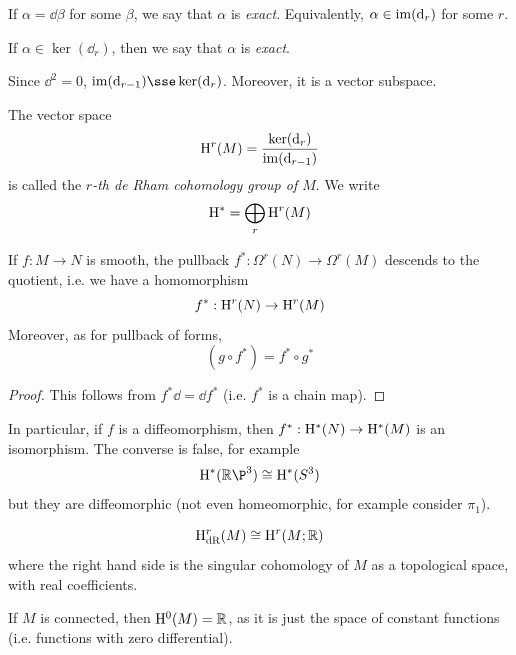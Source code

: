 \documentclass{article}
\begin{document}
\begin{definition}
     If \(\alpha = \dd\beta\) for some \(\beta\), we say that \(\alpha\) is \emph{exact}. Equivalently, \(\alpha \in \operatorname{im}(\dd_r)\) for some \(r\).
\end{definition}

\begin{definition}
     If \(\alpha \in \ker(\dd_r)\), then we say that \(\alpha\) is \emph{exact}.
\end{definition}

Since \(\dd^2 = 0\), \(\im(\dd_{r-1}) \sse \ker(\dd_r)\). Moreover, it is a vector subspace.

\begin{definition}
    The vector space
    \[\mathrm{H}^r(M) = \frac{\ker(\dd_r)}{\operatorname{im}(\dd_{r-1})}\]
    is called the \emph{\(r\)-th de Rham cohomology group of \(M\)}. We write
    \[\mathrm{H}^* = \bigoplus_r \mathrm{H}^r(M)\]
\end{definition}

\begin{proposition}
    If \(f : M \to N\) is smooth, the pullback \(f^* : \Omega^r(N) \to \Omega^r(M)\) descends to the quotient, i.e. we have a homomorphism
    \[f^* : \mathrm{H}^r(N) \to \mathrm{H}^r(M)\]
    Moreover, as for pullback of forms,
    \[(g \circ f^*) = f^* \circ g^*\]
\end{proposition}

\begin{proof}
    This follows from \(f^*\dd = \dd f^*\) (i.e. \(f^*\) is a chain map).
\end{proof}

\lec

In particular, if \(f\) is a diffeomorphism, then \(f^* : \mathrm{H}^*(N) \to \mathrm{H}^*(M)\) is an isomorphism. The converse is false, for example
\[\HH^*(\R\P^3) \cong \HH^*(S^3)\]
but they are diffeomorphic (not even homeomorphic, for example consider \(\pi_1\)).

\begin{theorem}
    [de Rham]
    \[\mathrm{H}^r_{\text{dR}}(M) \cong \mathrm{H}^r(M; \mathbb{R})\]
    where the right hand side is the singular cohomology of \(M\) as a topological space, with real coefficients.
\end{theorem}

If \(M\) is connected, then \(\mathrm{H}^0(M) = \mathbb{R}\), as it is just the space of constant functions (i.e. functions with zero differential).
\end{document}
